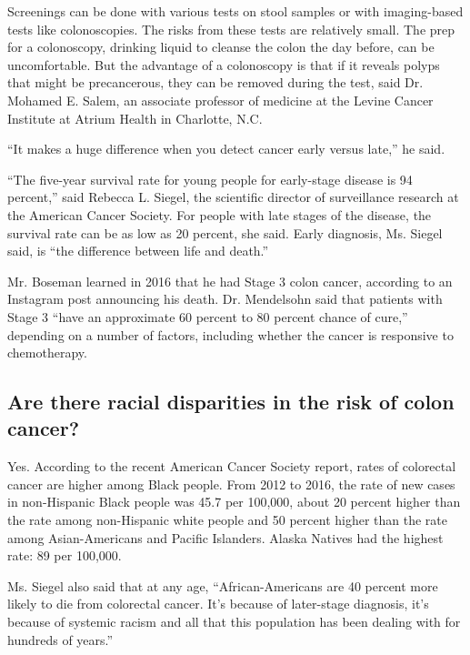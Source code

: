 Screenings can be done with various tests on stool samples or with
imaging-based tests like colonoscopies. The risks from these tests are
relatively small. The prep for a colonoscopy, drinking liquid to cleanse
the colon the day before, can be uncomfortable. But the advantage of a
colonoscopy is that if it reveals polyps that might be precancerous,
they can be removed during the test, said Dr. Mohamed E. Salem, an
associate professor of medicine at the Levine Cancer Institute at Atrium
Health in Charlotte, N.C.

``It makes a huge difference when you detect cancer early versus late,''
he said.

``The five-year survival rate for young people for early-stage disease
is 94 percent,'' said Rebecca L. Siegel, the scientific director of
surveillance research at the American Cancer Society. For people with
late stages of the disease, the survival rate can be as low as 20
percent, she said. Early diagnosis, Ms. Siegel said, is ``the difference
between life and death.''

Mr. Boseman learned in 2016 that he had Stage 3 colon cancer, according
to an Instagram post announcing his death. Dr. Mendelsohn said that
patients with Stage 3 ``have an approximate 60 percent to 80 percent
chance of cure,'' depending on a number of factors, including whether
the cancer is responsive to chemotherapy.

\hypertarget{are-there-racial-disparities-in-the-risk-of-colon-cancer}{%
\subsection{Are there racial disparities in the risk of colon
cancer?}\label{are-there-racial-disparities-in-the-risk-of-colon-cancer}}

Yes. According to the recent American Cancer Society report, rates of
colorectal cancer are higher among Black people. From 2012 to 2016, the
rate of new cases in non-Hispanic Black people was 45.7 per 100,000,
about 20 percent higher than the rate among non-Hispanic white people
and 50 percent higher than the rate among Asian-Americans and Pacific
Islanders. Alaska Natives had the highest rate: 89 per 100,000.

Ms. Siegel also said that at any age, ``African-Americans are 40 percent
more likely to die from colorectal cancer. It's because of later-stage
diagnosis, it's because of systemic racism and all that this population
has been dealing with for hundreds of years.''

